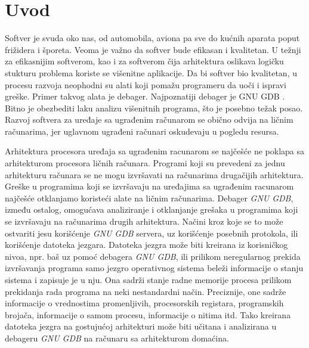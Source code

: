 \documentclass[12pt,oneside]{memoir}
\begin{document}
\frontmatter
\naslovna
\komisija
\tableofcontents*

\mainmatter

\chapter{Uvod}

Softver je svuda oko nas, od automobila, aviona pa sve do kućnih aparata poput frižidera i šporeta. Veoma je važno da softver bude efikasan i kvalitetan. U težnji za efikasnijim softverom, kao i za softverom čija arhitektura oslikava logičku stukturu problema koriste se višenitne aplikacije. Da bi softver bio kvalitetan, u procesu razvoja neophodni su alati koji pomažu programeru da uoči i ispravi greške. Primer takvog alata je debager. Najpoznatiji debager je GNU GDB \cite{GDB}. Bitno je obezbediti laku analizu višenitnih programa, što je posebno težak posao. Razvoj softvera za uređaje sa ugrađenim računarom se obično odvija na ličnim računarima, jer uglavnom ugrađeni računari oskudevaju u pogledu resursa.

Arhitektura procesora uređaja sa ugrađenim racunarom se najčešće ne poklapa sa  arhitekturom procesora ličnih računara. Programi koji su prevedeni za jednu arhitekturu računara se ne mogu izvršavati na računarima drugačijih arhitektura. Greške u programima koji se izvršavaju na uređajima sa ugrađenim racunarom najčešće otklanjamo koristeći alate na ličnim računarima. Debager \emph{GNU GDB}, između ostalog, omogućava analiziranje i otklanjanje grešaka u programima koji se izvršavaju na računarima drugih arhitektura. Načini kroz koje se to može ostvariti jesu korišćenje \emph{GNU GDB} servera, uz korišćenje posebnih protokola, ili korišćenje datoteka jezgara.
Datoteka jezgra može biti kreirana iz korisničkog nivoa, npr. baš uz pomoć debagera \emph{GNU GDB}, ili prilikom neregularnog prekida izvršavanja programa samo jezgro operativnog sistema beleži informacije o stanju sistema i zapisuje je u nju. Ona sadrži stanje radne memorije procesa prilikom prekidanja rada programa na neki nestandardni način. Preciznije, one sadrže informacije o vrednostima promenljivih, procesorskih registara, programskih brojača, informacije o samom procesu, informacije o nitima itd. Tako kreirana datoteka jezgra na gostujućoj arhitekturi može biti učitana i analizirana u debageru \emph{GNU GDB} na računaru sa arhitekturom domaćina.
\end{document}

